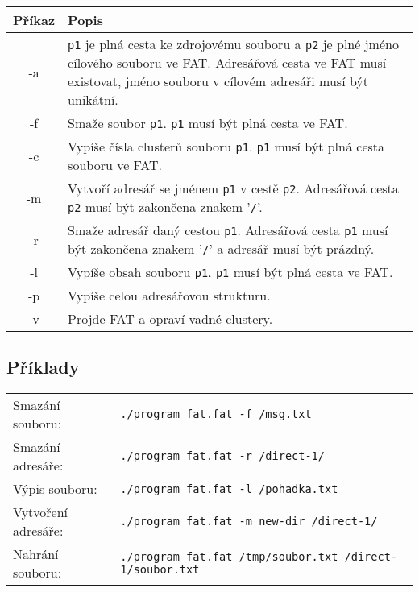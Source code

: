 \documentclass[11pt,a4paper]{scrartcl}
\begin{document}
	\begin{center}
		\begin{tabular}{|c|p{13cm}|}
			\hline
			Příkaz & Popis \\
			\hline
			-a & \verb|p1| je plná cesta ke zdrojovému souboru a \verb|p2| je plné jméno cílového souboru ve FAT. Adresářová cesta ve FAT musí existovat, jméno souboru v cílovém adresáři musí být unikátní.\\
			
			\hline
			
			-f & Smaže soubor \verb|p1|. \verb|p1| musí být plná cesta ve FAT. \\
			
			\hline
			
			-c & Vypíše čísla clusterů souboru \verb|p1|. \verb|p1| musí být plná cesta souboru ve FAT. \\
			
			\hline
			
			-m & Vytvoří adresář se jménem \verb|p1| v cestě \verb|p2|. Adresářová cesta \verb|p2| musí být zakončena znakem '\verb|/|'. \\
			
			\hline
			
			-r & Smaže adresář daný cestou \verb|p1|. Adresářová cesta \verb|p1| musí být zakončena znakem '\verb|/|' a adresář musí být prázdný. \\
			
			\hline
			
			-l & Vypíše obsah souboru \verb|p1|. \verb|p1| musí být plná cesta ve FAT. \\
			
			\hline
			
			-p & Vypíše celou adresářovou strukturu. \\
			
			\hline
			
			-v & Projde FAT a opraví vadné clustery. \\
			
			\hline
		\end{tabular}
	\end{center}
	
	\subsection{Příklady}
	
	\begin{tabular}{l l}
		Smazání souboru: & \verb|./program fat.fat -f /msg.txt|\\
		Smazání adresáře: & \verb|./program fat.fat -r /direct-1/| \\
		Výpis souboru: & \verb|./program fat.fat -l /pohadka.txt| \\
		Vytvoření adresáře: & \verb|./program fat.fat -m new-dir /direct-1/| \\
		Nahrání souboru: & \verb|./program fat.fat /tmp/soubor.txt /direct-1/soubor.txt| \\
		
		
	\end{tabular}
	
\end{document}
